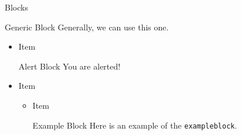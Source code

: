 \documentclass[12pt,t,hyperref={pdfencoding=auto}]{beamer}
\begin{document}
\begin{frame}[fragile]{Blocks}
  \begin{block}{Generic Block}
    Generally, we can use this one.
  \end{block}

  \begin{itemize}
    \item Item
      \begin{alertblock}{Alert Block}
        You are alerted!
      \end{alertblock}
    \item Item
      \begin{itemize}
        \item Item
          \begin{exampleblock}{Example Block}
            Here is an example of the \verb|exampleblock|.
          \end{exampleblock}
      \end{itemize}
  \end{itemize}
\end{frame}
\end{document}
